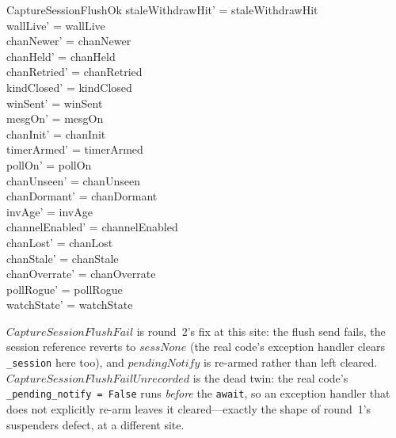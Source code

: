 \documentclass[a4paper,10pt,fleqn]{article}
\begin{document}
\begin{schema}{CaptureSessionFlushOk}
  staleWithdrawHit' = staleWithdrawHit \\
  wallLive' = wallLive \\
  chanNewer' = chanNewer \\
  chanHeld' = chanHeld \\
  chanRetried' = chanRetried \\
  kindClosed' = kindClosed \\
  winSent' = winSent \\
  mesgOn' = mesgOn \\
  chanInit' = chanInit \\
  timerArmed' = timerArmed \\
  pollOn' = pollOn \\
  chanUnseen' = chanUnseen \\
  chanDormant' = chanDormant \\
  invAge' = invAge \\
  channelEnabled' = channelEnabled \\
  chanLost' = chanLost \\
  chanStale' = chanStale \\
  chanOverrate' = chanOverrate \\
  pollRogue' = pollRogue \\
  watchState' = watchState
\end{schema}

$CaptureSessionFlushFail$ is round~2's fix at this site: the flush send
fails, the session reference reverts to $sessNone$ (the real code's
exception handler clears \texttt{\_session} here too), and
$pendingNotify$ is re-armed rather than left cleared.
$CaptureSessionFlushFailUnrecorded$ is the dead twin: the real code's
\texttt{\_pending\_notify = False} runs \emph{before} the
\texttt{await}, so an exception handler that does not explicitly
re-arm leaves it cleared---exactly the shape of round~1's suspenders
defect, at a different site.
\end{document}
